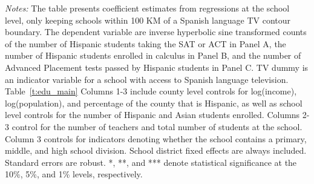 \begin{table}[!htbp]
{\begin{threeparttable}
\begin{tablenotes}[flushleft]
				\item \textit{Notes:} The table presents coefficient estimates from regressions at the school level, only keeping schools within 100 KM of a Spanish language TV contour boundary. The dependent variable are inverse hyperbolic sine transformed counts of the number of Hispanic students taking the SAT or ACT in Panel A, the number of Hispanic students enrolled in calculus in Panel B, and the number of Advanced Placement tests passed by Hispanic students in Panel C. TV dummy is an indicator variable for a school with access to Spanish language television. Table~\ref{t:edu_main}  Columns 1-3 include county level controls for log(income), log(population), and percentage of the county that is Hispanic, as well as school level controls for the number of Hispanic and Asian students enrolled. Columns 2-3 control for the number of teachers and total number of students at the school. Column 3 controls for indicators denoting whether the school contains a primary, middle, and high school division. School district fixed effects are always included. Standard errors are robust. *, **, and *** denote statistical significance at the 10\%, 5\%, and 1\% levels, respectively.
			\end{tablenotes}
		\end{threeparttable}
	}
\end{table}